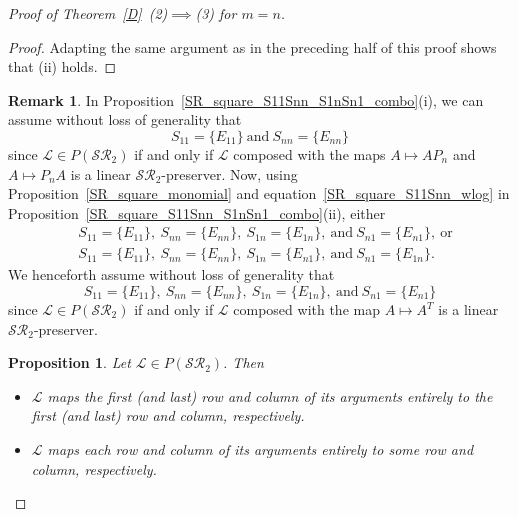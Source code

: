 \documentclass[11pt,reqno]{amsart}
\theoremstyle{plain}
\newtheorem{prop}[theorem]{Proposition}
\theoremstyle{definition}
\newtheorem{rem}[theorem]{Remark}
\numberwithin{equation}{section}
\begin{document}
\begin{proof}[Proof of Theorem~\ref{D}~(2)$\implies$(3) for $m=n$]
\begin{proof}
	Adapting the same argument as in the preceding half of this proof shows that (ii) holds.
	\end{proof}
	
	\begin{rem}
		In Proposition~\ref{SR_square_S11Snn_S1nSn1_combo}(i), we can assume without loss of generality that
		\begin{equation} \label{SR_square_S11Snn_wlog}
			S_{11}=\{E_{11}\}~\text{and}~S_{nn}=\{E_{nn}\}
		\end{equation}
		since $\mathcal{L}\in P(\mathcal{SR}_2)$ if and only if $\mathcal{L}$ composed with the maps $A\mapsto AP_n$ and $A\mapsto P_nA$ is a linear $\mathcal{SR}_2$-preserver. Now, using Proposition~\ref{SR_square_monomial} and equation~\eqref{SR_square_S11Snn_wlog} in Proposition~\ref{SR_square_S11Snn_S1nSn1_combo}(ii), either
		\begin{align*}
			&S_{11}=\{E_{11}\},~ S_{nn}=\{E_{nn}\},~ S_{1n}=\{E_{1n}\}, ~\text{and}~ S_{n1}=\{E_{n1}\},~ \text{or} \\
			&S_{11}=\{E_{11}\},~ S_{nn}=\{E_{nn}\},~ S_{1n}=\{E_{n1}\}, ~\text{and}~ S_{n1}=\{E_{1n}\}.
		\end{align*}
		We henceforth assume without loss of generality that
		\begin{equation}\label{SR_square_S11SnnS1nSn1_wlog}
			S_{11}=\{E_{11}\},~ S_{nn}=\{E_{nn}\},~ S_{1n}=\{E_{1n}\}, ~\text{and}~ S_{n1}=\{E_{n1}\}
		\end{equation}
		since $\mathcal{L}\in P(\mathcal{SR}_2)$ if and only if $\mathcal{L}$ composed with the map $A\mapsto A^T$ is a linear $\mathcal{SR}_2$-preserver.
	\end{rem}
	
	\begin{prop} \label{SR_square_firstLast_rowTOrow_colTOcol}
		Let $\mathcal{L}\in P(\mathcal{SR}_2)$. Then
		\begin{itemize}
			\item[(i)] $\mathcal{L}$ maps the first (and last) row and column of its arguments entirely to the first (and last) row and column, respectively.
			\item[(ii)] $\mathcal{L}$ maps each row and column of its arguments entirely to some row and column, respectively.
		\end{itemize}	
	\end{prop}
	

\end{proof}
\end{document}

